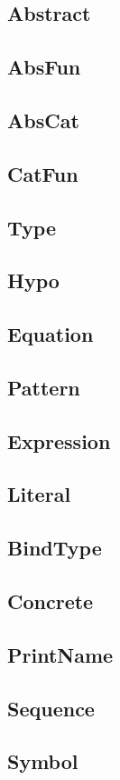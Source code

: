 \subsection{Abstract}
\subsection{AbsFun}
\subsection{AbsCat}
\subsection{CatFun}
\subsection{Type}
\subsection{Hypo}
\subsection{Equation}
\subsection{Pattern}
\subsection{Expression}
\subsection{Literal}
\subsection{BindType}
\subsection{Concrete}
\subsection{PrintName}
\subsection{Sequence}
\subsection{Symbol}
